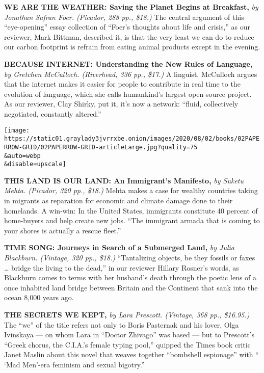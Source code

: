 \textbf{\textbf{WE ARE THE WEATHER: Saving the Planet Begins at
Breakfast,}} \emph{by Jonathan Safran Foer. (Picador, 288 pp., \$18.)}
The central argument of this ``eye-opening'' essay collection of
``Foer's thoughts about life and crisis,'' as our reviewer, Mark
Bittman, described it, is that the very least we can do to reduce our
carbon footprint is refrain from eating animal products except in the
evening.

\textbf{\textbf{BECAUSE INTERNET: Understanding the New Rules of
Language,}} \emph{by Gretchen McCulloch. (Riverhead, 336 pp., \$17.)} A
linguist, McCulloch argues that the internet makes it easier for people
to contribute in real time to the evolution of language, which she calls
humankind's largest open-source project. As our reviewer, Clay Shirky,
put it, it's now a network: ``fluid, collectively negotiated, constantly
altered.''

\texttt{[image: https://static01.graylady3jvrrxbe.onion/images/2020/08/02/books/02PAPERROW-GRID/02PAPERROW-GRID-articleLarge.jpg?quality=75\\\&auto=webp\\\&disable=upscale]}

\textbf{\textbf{THIS LAND IS OUR LAND: An Immigrant's Manifesto,}}
\emph{by Suketu Mehta. (Picador, 320 pp., \$18.)} Mehta makes a case for
wealthy countries taking in migrants as reparation for economic and
climate damage done to their homelands. A win-win: In the United States,
immigrants constitute 40 percent of home-buyers and help create new
jobs. ``The immigrant armada that is coming to your shores is actually a
rescue fleet.''

\textbf{\textbf{TIME SONG: Journeys in Search of a Submerged Land,}}
\emph{by Julia Blackburn. (Vintage, 320 pp., \$18.)} ``Tantalizing
objects, be they fossils or faxes \ldots{} bridge the living to the
dead,'' in our reviewer Hillary Rosner's words, as Blackburn comes to
terms with her husband's death through the poetic lens of a once
inhabited land bridge between Britain and the Continent that sank into
the ocean 8,000 years ago.

\textbf{\textbf{THE SECRETS WE KEPT,}} \emph{by Lara Prescott. (Vintage,
368 pp., \$16.95.)} The ``we'' of the title refers not only to Boris
Pasternak and his lover, Olga Ivinskaya --- on whom Lara in ``Doctor
Zhivago'' was based --- but to Prescott's ``Greek chorus, the C.I.A.'s
female typing pool,'' quipped the Times book critic Janet Maslin about
this novel that weaves together ``bombshell espionage'' with `` `Mad
Men'-era feminism and sexual bigotry.''

